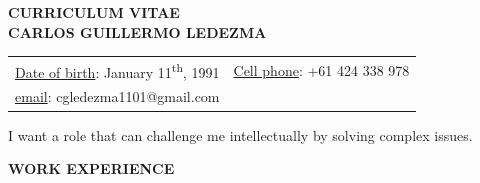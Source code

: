 \documentclass[10pt]{article}
\begin{document}

\begin{center}

\textbf{CURRICULUM VITAE} \\
\textbf{CARLOS GUILLERMO LEDEZMA}

\vspace{3mm}

\begin{tabular}{ll}

\underline{Date of birth}: January 11\textsuperscript{th}, 1991 & \underline{Cell phone}: +61 424 338 978 \\
\underline{email}: cgledezma1101@gmail.com & \\

\end{tabular}

\end{center}

I want a role that can challenge me intellectually by solving complex issues.

\begin{center}
	\textbf{\uppercase{Work experience}}
\end{center}

\vspace{3mm}
\end{document}
